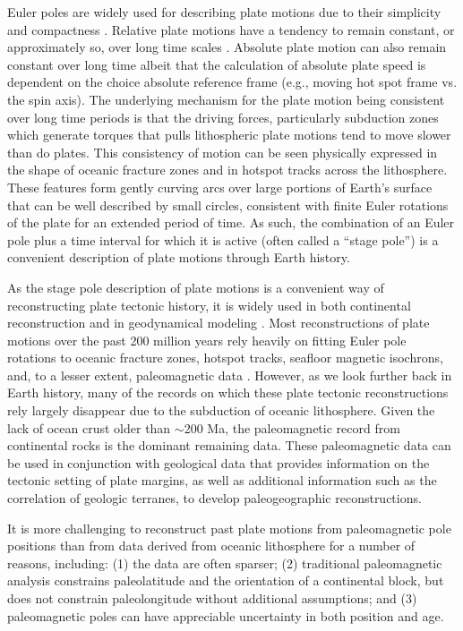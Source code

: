 \documentclass[11pt,letterpaper]{article}
\begin{document}
Euler poles are widely used for describing plate motions due to their simplicity and compactness \citep[e.g.][]{DeMets2010a, Argus2011a}. Relative plate motions have a tendency to remain constant, or approximately so, over long time scales \citep[e.g.][]{Iaffaldano2012a, Muller2016a}. Absolute plate motion can also remain constant over long time albeit that the calculation of absolute plate speed is dependent on the choice absolute reference frame (e.g., moving hot spot frame vs. the spin axis). The underlying mechanism for the plate motion being consistent over long time periods is that the driving forces, particularly subduction zones which generate torques that pulls lithospheric plate motions tend to move slower than do plates. This consistency of motion can be seen physically expressed in the shape of oceanic fracture zones and in hotspot tracks across the lithosphere. These features form gently curving arcs over large portions of Earth's surface that can be well described by small circles, consistent with finite Euler rotations of the plate for an extended period of time. As such, the combination of an Euler pole plus a time interval for which it is active (often called a ``stage pole'') is a convenient description of plate motions through Earth history.

As the stage pole description of plate motions is a convenient way of reconstructing plate tectonic history, it is widely used in both continental reconstruction \citep[e.g.][]{Boyden2011a} and in geodynamical modeling \citep[e.g.][]{Mcnamara2005a, Bull2014a}. Most reconstructions of plate motions over the past 200 million years rely heavily on fitting Euler pole rotations to oceanic fracture zones, hotspot tracks, seafloor magnetic isochrons, and, to a lesser extent, paleomagnetic data \citep{Muller1993a, Seton2012a, Muller2016a}. However, as we look further back in Earth history, many of the records on which these plate tectonic reconstructions rely largely disappear due to the subduction of oceanic lithosphere. Given the lack of ocean crust older than $\sim$200 Ma, the paleomagnetic record from continental rocks is the dominant remaining data. These paleomagnetic data can be used in conjunction with geological data that provides information on the tectonic setting of plate margins, as well as additional information such as the correlation of geologic terranes, to develop paleogeographic reconstructions.

It is more challenging to reconstruct past plate motions from paleomagnetic pole positions than from data derived from oceanic lithosphere for a number of reasons, including: (1) the data are often sparser; (2) traditional paleomagnetic analysis constrains paleolatitude and the orientation of a continental block, but does not constrain paleolongitude without additional assumptions; and (3) paleomagnetic poles can have appreciable uncertainty in both position and age.
\end{document}
